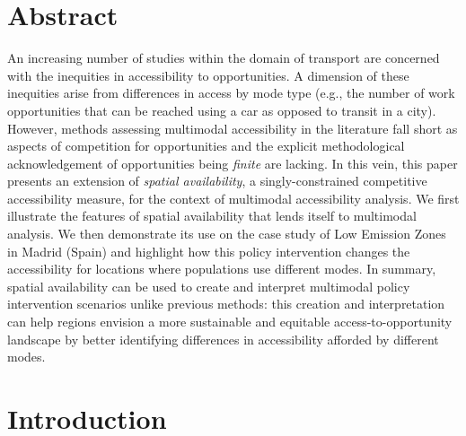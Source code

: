 \documentclass[10pt,letterpaper]{article}
\begin{document}

\linenumbers

\hypertarget{abstract}{%
\section{Abstract}\label{abstract}}

An increasing number of studies within the domain of transport are
concerned with the inequities in accessibility to opportunities. A
dimension of these inequities arise from differences in access by mode
type (e.g., the number of work opportunities that can be reached using a
car as opposed to transit in a city). However, methods assessing
multimodal accessibility in the literature fall short as aspects of
competition for opportunities and the explicit methodological
acknowledgement of opportunities being \emph{finite} are lacking. In
this vein, this paper presents an extension of \emph{spatial
availability}, a singly-constrained competitive accessibility measure,
for the context of multimodal accessibility analysis. We first
illustrate the features of spatial availability that lends itself to
multimodal analysis. We then demonstrate its use on the case study of
Low Emission Zones in Madrid (Spain) and highlight how this policy
intervention changes the accessibility for locations where populations
use different modes. In summary, spatial availability can be used to
create and interpret multimodal policy intervention scenarios unlike
previous methods: this creation and interpretation can help regions
envision a more sustainable and equitable access-to-opportunity
landscape by better identifying differences in accessibility afforded by
different modes.

\hypertarget{introduction}{%
\section{Introduction}\label{introduction}}
\end{document}
